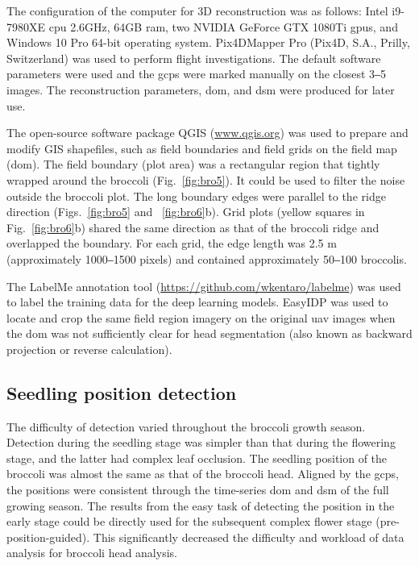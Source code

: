 The configuration of the computer for 3D reconstruction was as follows: Intel  i9-7980XE \gls{cpu} \@2.6GHz, 64GB \gls{ram}, two NVIDIA GeForce GTX 1080Ti \gls{gpu}s, and Windows 10 Pro 64-bit operating system. Pix4DMapper Pro (Pix4D, S.A., Prilly, Switzerland) was used to perform flight investigations. The default software parameters were used and the \gls{gcp}s were marked manually on the closest 3‒5 images. The reconstruction parameters, \gls{dom}, and \gls{dsm} were produced for later use. 

The open-source software package QGIS (\url{www.qgis.org}) was used to prepare and modify GIS shapefiles, such as field boundaries and field grids on the field map (\gls{dom}). The field boundary (plot area) was a rectangular region that tightly wrapped around the broccoli (Fig.~\ref{fig:bro5}). It could be used to filter the noise outside the broccoli plot. The long boundary edges were parallel to the ridge direction (Figs.~\ref{fig:bro5} and ~\ref{fig:bro6}b). Grid plots (yellow squares in Fig.~\ref{fig:bro6}b) shared the same direction as that of the broccoli ridge and overlapped the boundary. For each grid, the edge length was 2.5 m (approximately 1000‒1500 pixels) and contained approximately 50‒100 broccolis. 



The LabelMe annotation tool (\url{https://github.com/wkentaro/labelme}) was used to label the training data for the deep learning models. EasyIDP \citep[\url{https://github.com/UTokyo-FieldPhenomics-Lab/EasyIDP}]{wang_easyidp_2021} was used to locate and crop the same field region imagery on the original \gls{uav} images when the \gls{dom} was not sufficiently clear for head segmentation (also known as backward projection or reverse calculation).

\subsection{Seedling position detection}

The difficulty of detection varied throughout the broccoli growth season. Detection during the seedling stage was simpler than that during the flowering stage, and the latter had complex leaf occlusion. The seedling position of the broccoli was almost the same as that of the broccoli head. Aligned by the \gls{gcp}s, the positions were consistent through the time-series \gls{dom} and \gls{dsm} of the full growing season. The results from the easy task of detecting the position in the early stage could be directly used for the subsequent complex flower stage (pre-position-guided). This significantly decreased the difficulty and workload of data analysis for broccoli head analysis.

